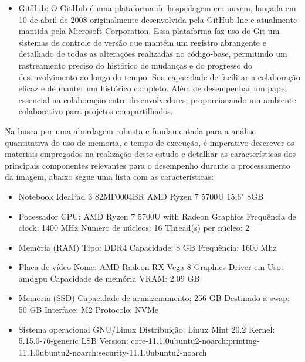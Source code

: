 \begin{itemize}
    \item GitHub: O GitHub é uma plataforma de hospedagem em nuvem, lançada em 10 de abril de 2008 originalmente desenvolvida pela GitHub Inc e atualmente mantida pela Microsoft Corporation. Essa plataforma faz uso do Git um sistemas de controle de versão que mantém um registro abrangente e detalhado de todas as alterações realizadas no código-base, permitindo um rastreamento preciso do histórico de mudanças e do progresso do desenvolvimento ao longo do tempo. Sua capacidade de facilitar a colaboração eficaz e de manter um histórico completo. Além de desempenhar um papel essencial na colaboração entre desenvolvedores, proporcionando um ambiente colaborativo para projetos compartilhados\cite{github}.

 \end{itemize}

Na busca por uma abordagem robusta e fundamentada para a análise quantitativa do uso de memoria, e tempo de execução, é imperativo descrever os materiais empregados na realização deste estudo e detalhar as características dos principais componentes relevantes para o desempenho durante o processamento da imagem, abaixo segue uma lista com as características:

\begin{itemize}

\item Notebook IdeaPad 3 82MF0004BR AMD Ryzen 7 5700U 15,6" 8GB 

\item Pocessador
\subitem CPU: AMD Ryzen 7 5700U with Radeon Graphics
\subitem Frequência de clock: 1400 MHz
\subitem Número de núcleos: 16
\subitem Thread(s) per núcleo: 2

\item Memória (RAM)
\subitem Tipo: DDR4
\subitem Capacidade: 8 GB
\subitem Frequência: 1600 Mhz

\item Placa de vídeo
\subitem Nome: AMD Radeon RX Vega 8 Graphics
\subitem Driver em Uso: amdgpu
\subitem Capacidade de memória VRAM: 2.09 GB

\item Memoria (SSD)
\subitem Capacidade de armazenamento: 256 GB
\subitem Destinado a swap: 50 GB
\subitem Interface: M2
\subitem Protocolo: NVMe

\item Sistema operacional GNU/Linux
\subitem Distribuição: Linux Mint 20.2
\subitem Kernel: 5.15.0-76-generic
\subitem LSB Version: core-11.1.0ubuntu2-noarch:printing-11.1.0ubuntu2-noarch:security-11.1.0ubuntu2-noarch




\end{itemize}


